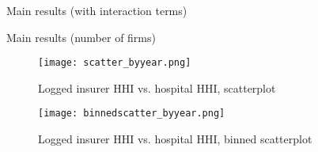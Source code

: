 \documentclass[12pt,letterpaper]{article}
\begin{document}
\begin{table}
\centering
\caption{Main results (with interaction terms)}

\end{table}
\restoregeometry

\begin{table}
\centering
\caption{Main results (number of firms)}

\end{table}

\clearpage

\begin{figure}[!h]
\begin{center}
\caption{Logged insurer HHI vs. hospital HHI, scatterplot}
\texttt{[image: scatter\_byyear.png]}
\end{center}
\end{figure}

\begin{figure}[!h]
\begin{center}
\caption{Logged insurer HHI vs. hospital HHI, binned scatterplot}
\texttt{[image: binnedscatter\_byyear.png]}
\end{center}
\end{figure}

\clearpage
\end{document}
